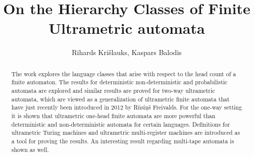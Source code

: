 \documentclass{llncs}
\begin{document}
\title{On the Hierarchy Classes of Finite Ultrametric automata}


\author{
Rihards Kri\v slauks, Kaspars Balodis}

\maketitle

\begin{abstract}
The work explores the language classes that arise with respect to the head count of a finite automaton. The results for deterministic non-deterministic and probabilistic automata are explored and similar results are proved for two-way ultrametric automata, which are viewed as a generalization of ultrametric finite automata that have just recently been introduced in 2012 by R\= usi\c n\v s Freivalds. For the one-way setting it is shown that ultrametric one-head finite automata are more powerful than deterministic and non-deterministic automata for certain languages. Definitions for ultrametric Turing machines and ultrametric multi-register machines are introduced as a tool for proving the results. An interesting result regarding multi-tape automata is shown as well.
\end{abstract}
\end{document}
